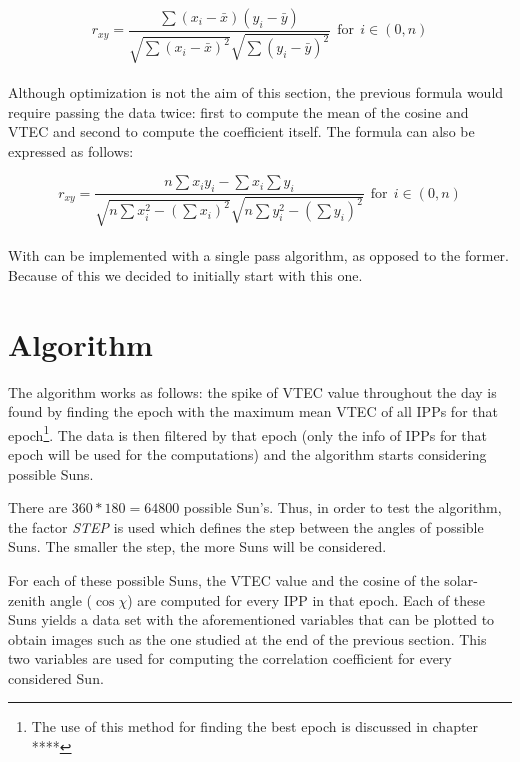 \begin{equation} \label{eq:coefficient}
r_{xy} = \frac{\sum(x_{i} - \bar{x})(y_{i} - \bar{y})}
{\sqrt{\sum(x_{i} - \bar{x})^{2}}
	\sqrt{\sum(y_{i} - \bar{y})^{2}}} \ \ \text{for} \ \ i \in (0, n)
\end{equation} \\

Although optimization is not the aim of this section, the previous formula would require passing the data twice: first to compute the mean of the cosine and VTEC and second to compute the coefficient itself. The formula can also be expressed as follows:

\begin{equation} \label{eq:singlePass}
r_{xy} = \frac{n\sum x_{i}y_{i} - \sum x_{i}\sum y_{i}}
{\sqrt{n\sum x_{i}^{2} - (\sum x_{i})^{2}}
	\sqrt{n\sum y_{i}^{2} - (\sum y_{i})^{2}}}  \ \ \text{for} \ \ i \in (0, n)
\end{equation} \\

With can be implemented with a single pass algorithm, as opposed to the former. Because of this we decided to initially start with this one.

\section{Algorithm}

The algorithm works as follows: the spike of VTEC value throughout the day is found by finding the epoch with the maximum mean VTEC of all IPPs for that epoch\footnote{The use of this method for finding the best epoch is discussed in chapter **** }.
The data is then filtered by that epoch (only the info of IPPs for that epoch will be used for the computations) and the algorithm starts considering possible Suns.

There are $360 * 180 = 64800$ possible Sun's. Thus, in order to test the algorithm, the factor \textit{STEP} is used which defines the step between the angles of possible Suns. The smaller the step, the more Suns will be considered. 

For each of these possible Suns, the VTEC value and the cosine of the solar-zenith angle ($\cos \chi$) are computed for every IPP in that epoch. Each of these Suns yields a data set with the aforementioned variables that can be plotted to obtain images such as the one studied at the end of the previous section. This two variables are used for computing the correlation coefficient for every considered Sun.

